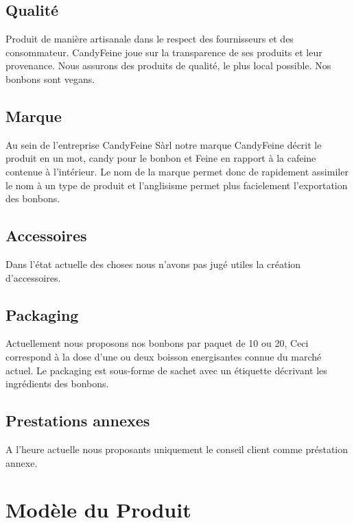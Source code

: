 \documentclass{article}
\begin{document}
\subsection{Qualité}
Produit de manière artisanale dans le respect des fournisseurs et des consommateur.
CandyFeine joue sur la transparence de ses produits et leur provenance.
Nous assurons des produits de qualité, le plus local possible. Nos bonbons sont vegans.
\subsection{Marque}
Au sein de l'entreprise CandyFeine Sàrl notre marque CandyFeine décrit le produit en un mot, candy pour le bonbon et Feine en rapport à la cafeine contenue à l'intérieur.
Le nom de la marque permet donc de rapidement assimiler le nom à un type de produit et l'anglisisme permet plus facielement l'exportation des bonbons.

\subsection{Accessoires}
Dans l'état actuelle des choses nous n'avons pas jugé utiles la création d'accessoires.

\subsection{Packaging}
Actuellement nous proposons nos bonbons par paquet de 10 ou 20, Ceci correspond à la dose d'une ou deux boisson energisantes connue du marché actuel.
Le packaging est sous-forme de sachet avec un étiquette décrivant les ingrédients des bonbons.

\subsection{Prestations annexes}
A l'heure actuelle nous proposants uniquement le conseil client comme préstation annexe.

\section{Modèle du Produit}
\end{document}
